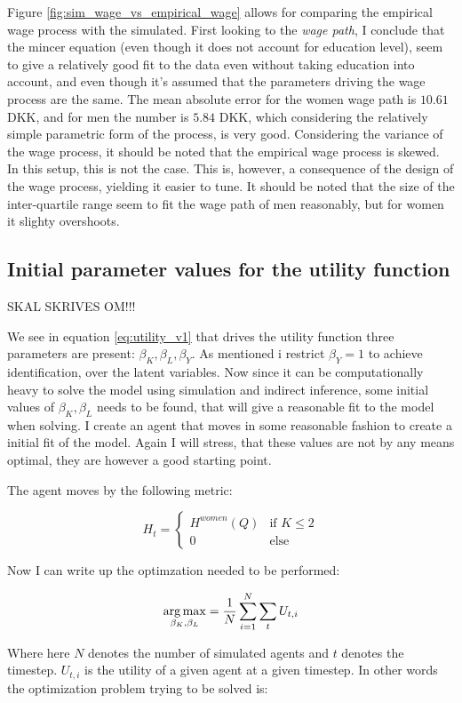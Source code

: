 Figure \ref{fig:sim_wage_vs_empirical_wage} allows for comparing the empirical wage process with the simulated. First looking to the \textit{wage path}, I conclude that the mincer equation (even though it does not account for education level), seem to give a relatively good fit to the data even without taking education into account, and even though it's assumed that the parameters driving the wage process are the same. The mean absolute error for the women wage path is $10.61$ DKK, and for men the number is $5.84$ DKK, which considering the relatively simple parametric form of the process, is very good. Considering the variance of the wage process, it should be noted that the empirical wage process is skewed. In this setup, this is not the case. This is, however, a consequence of the design of the wage process, yielding it easier to tune. It should be noted that the size of the inter-quartile range seem to fit the wage path of men reasonably, but for women it slighty overshoots.

\subsection{Initial parameter values for the utility function}

SKAL SKRIVES OM!!!

We see in equation \eqref{eq:utility_v1} that drives the utility function three parameters are present: $\beta_K, \beta_L, \beta_Y$. As mentioned i restrict $\beta_Y = 1$ to achieve identification, over the latent variables. Now since it can be computationally heavy to solve the model using simulation and indirect inference, some initial values of $\beta_K, \beta_L$ needs to be found, that will give a reasonable fit to the model when solving. I create an agent that moves in some reasonable fashion to create a initial fit of the model. Again I will stress, that these values are not by any means optimal, they are however a good starting point.

The agent moves by the following metric:

\begin{equation}
    H_t = \begin{cases}
        H^{women}(Q) & \text{if } K\leq 2 \\
        0 & \text{else } 
    \end{cases}
\end{equation}

Now I can write up the optimzation needed to be performed:

\begin{equation}
    \underset{\beta_K, \beta_L}{\operatorname*{arg\,max}} = \frac{1}{N} \sum_{i=1}^{N}  \sum_{t } U_{t, i} 
\end{equation}

Where here $N$ denotes the number of simulated agents and $t$ denotes the timestep. $U_{t,i}$ is the utility of a given agent at a given timestep. In other words the optimization problem trying to be solved is:
